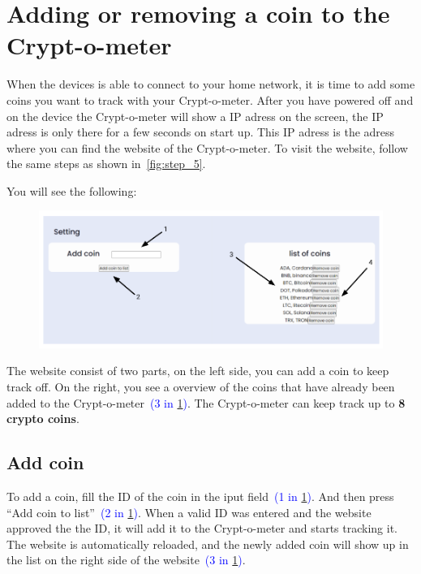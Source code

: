 \documentclass[11pt]{article}
\begin{document}
    \newpage
    \section{Adding or removing a coin to the Crypt-o-meter}\label{sec:adding-or-removing-a-coin-to-the-Crypt-o-meter}
    When the devices is able to connect to your home network, it is time to add some coins you want to track with your Crypt-o-meter.
    After you have powered off and on the device the Crypt-o-meter will show a IP adress on the screen, the IP adress is only there for a few seconds on start up.
    This IP adress is the adress where you can find the website of the Crypt-o-meter.
    To visit the website, follow the same steps as shown in~\textcolor{blue}{\cref{fig:step_5}}.

    You will see the following:
    \begin{figure}[H]
        \centering
        \includegraphics[width=\textwidth]{webserver}
        \caption{}
        \label{fig:webserver}
    \end{figure}

    The website consist of two parts, on the left side, you can add a coin to keep track off.
    On the right, you see a overview of the coins that have already been added to the Crypt-o-meter~\textcolor{blue}{(3 in \cref{fig:webserver})}.
    The Crypt-o-meter can keep track up to \textbf{8 crypto coins}.

    \subsection{Add coin}\label{subsec:add-coin}
    To add a coin, fill the ID of the coin in the iput field~\textcolor{blue}{(1 in \cref{fig:webserver})}.
    And then press ``Add coin to list''~\textcolor{blue}{(2 in \cref{fig:webserver})}.
    When a valid ID was entered and the website approved the the ID, it will add it to the Crypt-o-meter and starts tracking it.
    The website is automatically reloaded, and the newly added coin will show up in the list on the right side of the website~\textcolor{blue}{(3 in \cref{fig:webserver})}.
\end{document}
